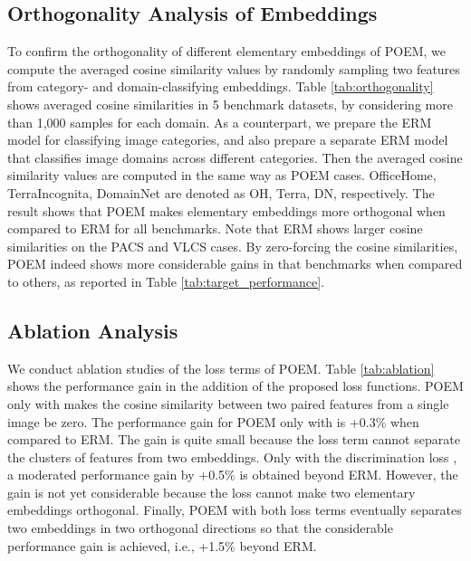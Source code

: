 \documentclass[letterpaper]{article} \usepackage{aaai23}  \usepackage{times}  \usepackage{helvet}  \usepackage{courier}  \usepackage[hyphens]{url}  \usepackage{graphicx} \urlstyle{rm} \def\UrlFont{\rm}  \usepackage{natbib}  \usepackage{caption} \frenchspacing  \setlength{\pdfpagewidth}{8.5in}  \setlength{\pdfpageheight}{11in}  \usepackage[labelsep=period]{caption}
\begin{document}
\subsection{Orthogonality Analysis of Embeddings}
To confirm the orthogonality of different elementary embeddings of POEM, we compute the averaged cosine similarity values by randomly sampling two features from category- and domain-classifying embeddings.
Table \ref{tab:orthogonality} shows averaged cosine similarities in 5 benchmark datasets, by considering more than 1,000 samples for each domain.
As a counterpart, we prepare the ERM model for classifying image categories, and also prepare a separate ERM model that classifies image domains across different categories.
Then the averaged cosine similarity values are computed in the same way as POEM cases.
OfficeHome, TerraIncognita, DomainNet are denoted as OH, Terra, DN, respectively. 
The result shows that POEM makes elementary embeddings more orthogonal when compared to ERM for all benchmarks.
Note that ERM shows larger cosine similarities on the PACS and VLCS cases. 
By zero-forcing the cosine similarities, POEM indeed shows more considerable gains in that benchmarks when compared to others, as reported in Table \ref{tab:target_performance}.


\subsection{Ablation Analysis}
We conduct ablation studies of the loss terms of POEM. 
Table \ref{tab:ablation} shows the performance gain in the addition of the proposed loss functions. 
POEM only with  makes the cosine similarity between two paired features from a single image be zero. The performance gain for POEM only with  is +0.3\% when compared to ERM. The gain is quite small because the loss term  cannot separate the clusters of features from two embeddings.
Only with the discrimination loss , a moderated performance gain by +0.5\% is obtained beyond ERM.
However, the gain is not yet considerable because the loss cannot make two elementary embeddings orthogonal.
Finally, POEM with both loss terms eventually separates two embeddings in two orthogonal directions so that the considerable performance gain is achieved, i.e., +1.5\% beyond ERM.
\end{document}
